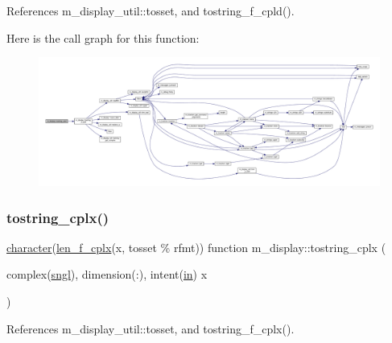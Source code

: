 References m\+\_\+display\+\_\+util\+::tosset, and tostring\+\_\+f\+\_\+cpld().

Here is the call graph for this function\+:
\nopagebreak
\begin{figure}[H]
\begin{center}
\leavevmode
\includegraphics[width=350pt]{namespacem__display_a12b973ec5880a8f0d789fbdf433d177f_cgraph}
\end{center}
\end{figure}
\mbox{\label{namespacem__display_a1b05d11dd12d88ce00f912751be126f3}} 
\subsubsection{\texorpdfstring{tostring\+\_\+cplx()}{tostring\_cplx()}}
{\footnotesize\ttfamily \hyperlink{option__stopwatch_83_8txt_abd4b21fbbd175834027b5224bfe97e66}{character}(\hyperlink{namespacem__display_a37f268a7276f14d4975200a8f83acff3}{len\+\_\+f\+\_\+cplx}(x, tosset \% rfmt)) function m\+\_\+display\+::tostring\+\_\+cplx (\begin{DoxyParamCaption}\item[{complex(\hyperlink{namespacem__display_a2ac86bc535c3ccc5947dbb3109c666b5}{sngl}), dimension(\+:), intent(\hyperlink{M__journal_83_8txt_afce72651d1eed785a2132bee863b2f38}{in})}]{x }\end{DoxyParamCaption})\hspace{0.3cm}{\ttfamily [private]}}



References m\+\_\+display\+\_\+util\+::tosset, and tostring\+\_\+f\+\_\+cplx().

